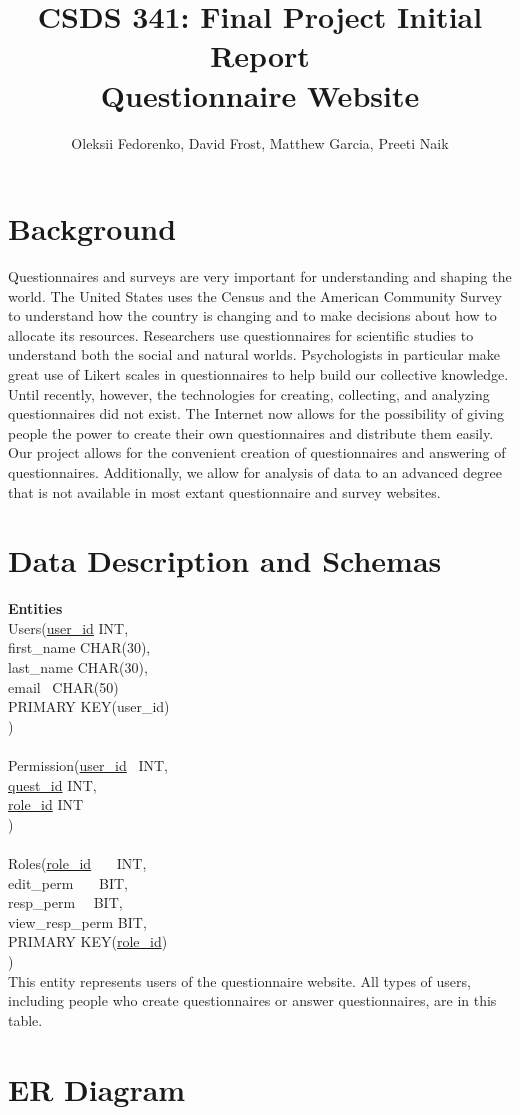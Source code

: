 \documentclass[12pt, oneside, a4paper]{article}
\title{CSDS 341: Final Project Initial Report\\ Questionnaire Website}
\author{Oleksii Fedorenko, David Frost, Matthew Garcia, Preeti Naik}
\begin{document}
    \maketitle
    \section{Background}
    Questionnaires and surveys are very important for understanding and shaping the world. The United States uses the Census and the
    American Community Survey to understand how the country is changing and to make decisions about how to allocate its
    resources. Researchers use questionnaires for scientific studies to understand both the social and natural worlds.
    Psychologists in particular make great use of Likert scales in questionnaires to help build our collective knowledge.
    Until recently, however, the technologies for creating, collecting, and analyzing questionnaires did not exist.
    The Internet now allows for the possibility of giving people the power to create their own questionnaires and distribute
    them easily. Our project allows for the convenient creation of questionnaires and answering of questionnaires. Additionally,
    we allow for analysis of data to an advanced degree that is not available in most extant questionnaire and survey websites.
    \section{Data Description and Schemas}
    \textbf{Entities}
    \\
    Users(\underline{user\_id} \indent\indent INT,\\
    \hphantom{Users(}first\_name \indent CHAR(30),\\
    \hphantom{Users(}last\_name \indent \thinspace CHAR(30),\\
    \hphantom{Users(}email \indent\indent\ \thinspace CHAR(50)\\
    \hphantom{Users(}PRIMARY KEY(user\_id)\\
    )
    \\
    \\
    Permission(\underline{user\_id} \indent \ \thinspace INT,\\
    \hphantom{Permission(}\underline{quest\_id} \indent INT,\\
    \hphantom{Permission(}\underline{role\_id} \indent INT\\
    )
    \\
    \\
    Roles(\underline{role\_id} \indent\indent\indent \ \ \ INT,\\
    \hphantom{Roles(}edit\_perm \indent\indent\ \ \ BIT,\\
    \hphantom{Roles(}resp\_perm \indent\indent\ \ \thinspace BIT,\\
    \hphantom{Roles(}view\_resp\_perm \indent BIT,\\
    \hphantom{Roles(}PRIMARY KEY(\underline{role\_id})\\
    )
    \\
    This entity represents users of the questionnaire website.
    All types of users, including people who create questionnaires
    or answer questionnaires, are in this table.
    \section{ER Diagram}
\end{document}
